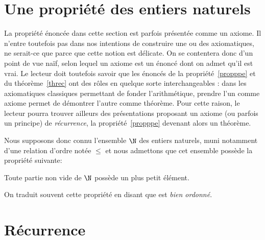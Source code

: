 
\renewcommand{\theprop}{(\ensuremath{\fnsymbol{prop}})}

%
\section{Une propriété des entiers naturels}
La propriété énoncée dans cette section est parfois présentée comme un axiome. Il n'entre toutefois pas dans nos intentions de construire une ou des axiomatiques, ne serait-ce que parce que cette notion est délicate. On se contentera donc d'un point de vue naïf, selon lequel un axiome est un énoncé dont on admet qu'il est vrai. Le lecteur doit toutefois savoir que les énoncés de la propriété~\ref{propppe} et du théorème~\ref{threc} ont des rôles en quelque sorte interchangeables : dans les axiomatiques classiques permettant de fonder l'arithmétique, prendre l'un comme axiome permet de démontrer l'autre comme théorème. Pour cette raison, le lecteur pourra trouver ailleurs des présentations proposant un axiome (ou parfois un principe) de \emph{récurrence}, la propriété~\ref{propppe} devenant alors un théorème.
\par
\vspace{0.5\baselineskip}\par
Nous supposons donc connu l'ensemble $\N$ des entiers naturels, muni notamment d'une relation d'ordre notée ${≤}$ et nous admettons que cet ensemble  possède la propriété suivante:
%
\begin{prop}
Toute partie non vide de $\N$ possède un plus petit élément.\label{propppe}
\end{prop}

On traduit souvent cette propriété en disant que \N{} est \emph{bien ordonné}.


\section{Récurrence}
